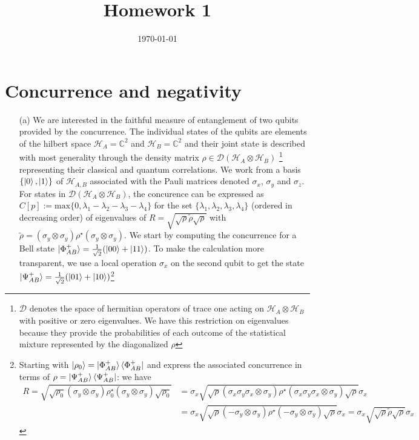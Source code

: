 \documentclass[10pt, a4paper]{article}
\title{Homework 1} %
\author{\PA} %
\date{\today} %
\begin{document}
\maketitlepage

\maketableofcontents


\footnotesize{

\section{Concurrence and negativity}

\begin{enumerate}
  \item[(a)] We are interested in the faithful measure of entanglement of two qubits provided by the concurrence. The individual states of the qubits are elements of the hilbert space $\mathcal{H}_{A} = \mathbb{C}^2$ and $\mathcal{H}_{B} = \mathbb{C}^2$ and their joint state is described with most generality through the density matrix $\rho \in \mathcal{D}(\mathcal{H}_A \otimes \mathcal{H}_B)$ \footnote{$\mathcal{D}$ denotes the space of hermitian operators of trace one acting on $\mathcal{H}_A \otimes \mathcal{H}_B$ with positive or zero eigenvalues. We have this restriction on eigenvalues because they provide the probabilities of each outcome of the statistical mixture represented by the diagonalized $\rho$} representing their classical and quantum correlations. We work from a basis $\{\ket{0}, \ket{1}\}$ of $\mathcal{H}_{A, B}$ associated with the Pauli matrices denoted $\sigma_x$, $\sigma_y$ and $\sigma_z$. For states in $\mathcal{D}(\mathcal{H}_A \otimes \mathcal{H}_B)$, the concurence can be expressed as $C[p] := \text{max}\{0, \lambda_1 - \lambda_2 - \lambda_3 - \lambda_4\}$ for the set $\{\lambda_1, \lambda_2, \lambda_3, \lambda_4\}$ (ordered in decreasing order) of eigenvalues of $R = \sqrt{\sqrt{\rho} \tilde{\rho} \sqrt{\rho}}$ with $\tilde{\rho} = (\sigma_y \otimes \sigma_y) \rho^{\star}(\sigma_y \otimes \sigma_y)$. We start by computing the concurrence for a Bell state $\ket{\Phi^{+}_{AB}} = \frac{1}{\sqrt{2}}(\ket{00} + \ket{11})$. To make the calculation more transparent, we use a local operation $\sigma_x$ on the second qubit to get the state $\ket{\Psi^{+}_{AB}} = \frac{1}{\sqrt{2}}(\ket{01} + \ket{10})$\footnote{Starting with $\ket{\rho_0} = \ket{\Phi^{+}_{AB}}\bra{\Phi^{+}_{AB}}$ and express the associated concurrence in terms of $\rho = \ket{\Psi^{+}_{AB}} \bra{\Psi^{+}_{AB}}$: we have 
  \begin{align*}
    R = \sqrt{\sqrt{\rho_0} (\sigma_y \otimes \sigma_y) \rho_0^{\star}(\sigma_y \otimes \sigma_y) \sqrt{\rho_0}} &= \sigma_x\sqrt{\sqrt{\rho} (\sigma_x\sigma_y\sigma_x \otimes \sigma_y) \rho^{\star}(\sigma_x\sigma_y\sigma_x \otimes \sigma_y) \sqrt{\rho}}\sigma_x \\&= \sigma_x\sqrt{\sqrt{\rho} (-\sigma_y \otimes \sigma_y) \rho^{\star}(-\sigma_y \otimes \sigma_y) \sqrt{\rho}}\sigma_x = \sigma_x\sqrt{\sqrt{\rho} \tilde{\rho} \sqrt{\rho}}\sigma_x

\end{align*}}
\end{enumerate}}
\end{document}
